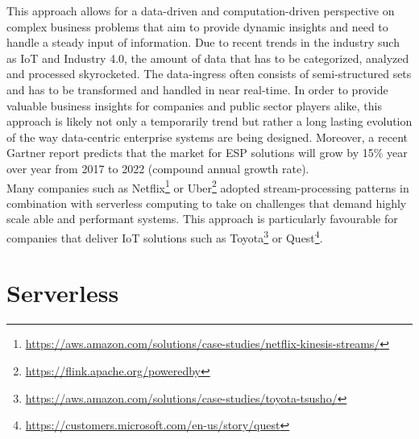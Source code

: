 This approach allows for a data-driven and computation-driven perspective on complex business problems that aim to provide dynamic insights and need to handle a steady input of information. 
Due to recent trends in the industry such as IoT and Industry 4.0, the amount of data that has to be categorized, analyzed and processed skyrocketed. The data-ingress often consists of semi-structured sets and has to be transformed and handled in near real-time.\autocite{Dekate2017PredictsInfrastructure} In order to provide valuable business insights for companies and public sector players alike, this approach is likely not only a temporarily trend but rather a long lasting evolution of the way data-centric enterprise systems are being designed. Moreover, a recent Gartner report predicts that the market for \acf{ESP} solutions will grow by 15\% year over year from 2017 to 2022 (compound annual growth rate).\autocite{Heudecker2017MarketProcessing} \\
Many companies such as Netflix\footnote{\url{https://aws.amazon.com/solutions/case-studies/netflix-kinesis-streams/}} or Uber\footnote{\url{https://flink.apache.org/poweredby}} adopted stream-processing patterns in combination with serverless computing to take on challenges that demand highly scale able and performant systems. 
This approach is particularly favourable for companies that deliver IoT solutions such as Toyota\footnote{\url{https://aws.amazon.com/solutions/case-studies/toyota-tsusho/}} or Quest\footnote{\url{https://customers.microsoft.com/en-us/story/quest}}.


\section{Serverless}

